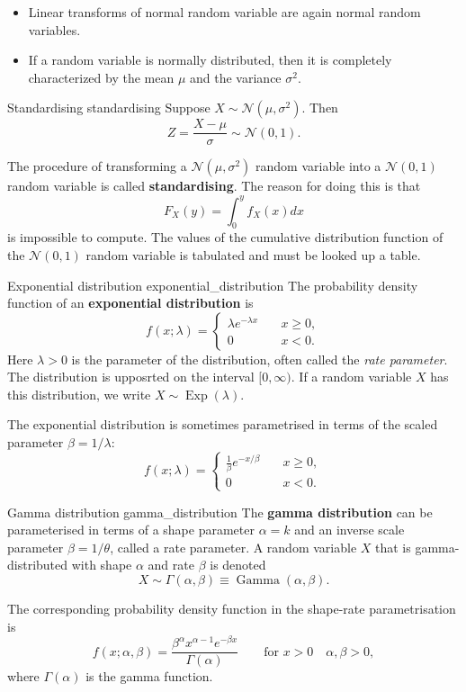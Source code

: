 \begin{itemize}
	\item Linear transforms of normal random variable are again	normal random variables.
	\item If a random variable is normally distributed, then it is completely
	characterized by the mean $\mu$ and the variance $\sigma^2$.	
\end{itemize}

\begin{corollary}{Standardising \cite{math2901_notes}}{standardising}
	Suppose $X \sim \mathcal{N}(\mu, \sigma^2)$. Then
	$$ Z = \frac{X - \mu}{\sigma} \sim \mathcal{N}(0, 1) . $$
\end{corollary}

The procedure of transforming a $\mathcal{N}(\mu, \sigma^2)$ random variable into a $\mathcal{N}(0, 1)$ random variable is called \textbf{standardising}. The reason for doing this is that
$$ F_X(y) = \int_0^y f_X(x) dx $$
is impossible to compute. The values of the cumulative distribution function of the $\mathcal{N}(0, 1)$ random variable is tabulated and must be looked up a table.

\begin{definition}{Exponential distribution \cite{wikipedia_exponential_distribution}}{exponential_distribution}
	The probability density function of an \textbf{exponential distribution} is
	$$
		f(x; \lambda) = 
			\begin{cases}
				\lambda e^{-\lambda x} \quad &x \geq 0, \\
				0 \quad &x < 0. 
			\end{cases}
	$$
	Here $\lambda > 0$ is the parameter of the distribution, often called the \textit{rate parameter}. The distribution is upposrted on the interval $[0, \infty)$. If a random variable $X$ has this distribution, we write $X \sim \operatorname{Exp}(\lambda)$.

	The exponential distribution is sometimes parametrised in terms of the scaled parameter $\beta = 1/\lambda$:
	$$
		f(x; \lambda) = 
			\begin{cases}
				\frac{1}{\beta} e^{-x/\beta} \quad &x \geq 0, \\
				0 \quad &x < 0. 
			\end{cases}
	$$
\end{definition}

\begin{definition}{Gamma distribution \cite{wikipedia_gamma_distribution}}{gamma_distribution}
	The \textbf{gamma distribution} can be parameterised in terms of a shape parameter $\alpha = k$ and an inverse scale parameter $\beta = 1/\theta$, called a rate parameter. A random variable $X$ that is gamma-distributed with shape $\alpha$ and rate $\beta$ is denoted
	$$ X \sim \Gamma(\alpha, \beta) \equiv \operatorname{Gamma}(\alpha, \beta) . $$
	
	The corresponding probability density function in the shape-rate parametrisation is
	$$
		f(x; \alpha, \beta) = 
		\frac{\beta^\alpha x^{\alpha - 1} e^{-\beta x}}{\Gamma(\alpha)}
		\qquad \text{for } x > 0 \quad \alpha, \beta > 0,
	$$
	where $\Gamma(\alpha)$ is the gamma function.
\end{definition}

